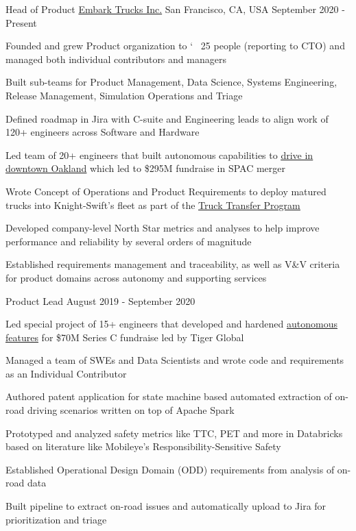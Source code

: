 \begin{center}
  \vspace{-1mm}
  \cventry
    {Head of Product}
    {\href{https://embarktrucks.com}{Embark Trucks Inc.}}
    {San Francisco, CA, USA}
    {September 2020 - Present}
    {
      \begin{cvitems}
        \item {Founded and grew Product organization to \char`~ 25 people (reporting to CTO) and managed both individual contributors and managers}
        \item {Built sub-teams for Product Management, Data Science, Systems Engineering, Release Management, Simulation Operations and Triage}
        \item {Defined roadmap in Jira with C-suite and Engineering leads to align work of 120+ engineers across Software and Hardware}
        \item {Led team of 20+ engineers that built autonomous capabilities to \href{https://www.youtube.com/watch?v=6-02xycYbws}{\underline{drive in downtown Oakland}} which led to \$295M fundraise in SPAC merger}
        \item {Wrote Concept of Operations and Product Requirements to deploy matured trucks into Knight-Swift's fleet as part of the \href{https://www.youtube.com/watch?v=CBnEjgEuQuA}{\underline{Truck Transfer Program}}}
        \item {Developed company-level North Star metrics and analyses to help improve performance and reliability by several orders of magnitude}
        \item {Established requirements management and traceability, as well as V\&V criteria for product domains across autonomy and supporting services}
      \end{cvitems} 
    }
\end{center}
\begin{center}
  \cvsubentry
    {Product Lead}
    {August 2019 - September 2020}
    {
      \begin{cvitems}
        \item {Led special project of 15+ engineers that developed and hardened \href{https://www.youtube.com/watch?v=llAQyawBau0}{\underline{autonomous features}} for \$70M Series C fundraise led by Tiger Global}
        \item {Managed a team of SWEs and Data Scientists and wrote code and requirements as an Individual Contributor}
        \item {Authored patent application for state machine based automated extraction of on-road driving scenarios written on top of Apache Spark}
        \item {Prototyped and analyzed safety metrics like TTC, PET and more in Databricks based on literature like Mobileye's Responsibility-Sensitive Safety}
        \item {Established Operational Design Domain (ODD) requirements from analysis of on-road data}
        \item {Built pipeline to extract on-road issues and automatically upload to Jira for prioritization and triage}
      \end{cvitems} 
    }
\end{center}
